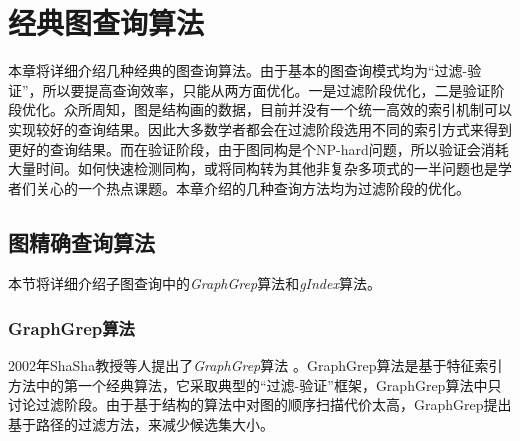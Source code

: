 \documentclass{XDBAthesis}
\begin{document}
\else
\fi
\chapter{经典图查询算法}
\label{chap:classic}
本章将详细介绍几种经典的图查询算法。由于基本的图查询模式均为“过滤-验证”，所以要提高查询效率，只能从两方面优化。一是过滤阶段优化，二是验证阶段优化。众所周知，图是结构画的数据，目前并没有一个统一高效的索引机制可以实现较好的查询结果。因此大多数学者都会在过滤阶段选用不同的索引方式来得到更好的查询结果。而在验证阶段，由于图同构是个NP-hard问题，所以验证会消耗大量时间。如何快速检测同构，或将同构转为其他非复杂多项式的一半问题也是学者们关心的一个热点课题。本章介绍的几种查询方法均为过滤阶段的优化。
\section{图精确查询算法}
本节将详细介绍子图查询中的\emph{GraphGrep}算法\cite{graphgrep}和\emph{gIndex}算法\cite{gIndex}。
\subsection{GraphGrep算法}
2002年ShaSha教授等人提出了\emph{GraphGrep}算法\cite{graphgrep} 。GraphGrep算法是基于特征索引方法中的第一个经典算法，它采取典型的“过滤-验证”框架，GraphGrep算法中只讨论过滤阶段。由于基于结构的算法中对图的顺序扫描代价太高，GraphGrep提出基于路径的过滤方法，来减少候选集大小。
\end{document}
